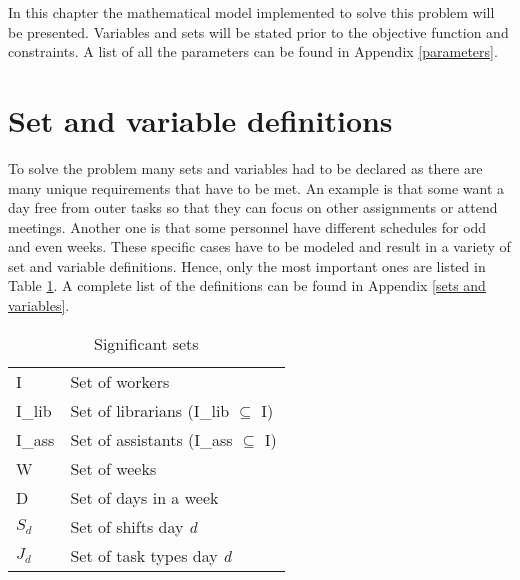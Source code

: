 In this chapter the mathematical model implemented to solve this problem will be presented. Variables and sets will be stated prior to the objective function and constraints. A list of all the parameters can be found in Appendix \ref{parameters}. 
\section{Set and variable definitions} \label{variables}
To solve the problem many sets and variables had to be declared as there are many unique requirements that have to be met. An example is that some want a day free from outer tasks so that they can focus on other assignments or attend meetings. Another one is that some personnel have different schedules for odd and even weeks. These specific cases have to be modeled and result in a variety of set and variable definitions. Hence, only the most important ones are listed in Table \ref{tab:sets}. A complete list of the definitions can be found in Appendix \ref{sets and variables}.
\begin{table}[H]
\centering
\caption{Significant sets}
\label{tab:sets}
\begin{tabular}{ll}
I                & Set of workers                                             \\
I\_lib	& Set of librarians (I\_lib $\subseteq$ I)	\\
I\_ass	& Set of assistants (I\_ass $\subseteq$ I)	\\
W                & Set of weeks                                               \\
D                & Set of days in a week                                      \\
$S_d$           & Set of shifts day \textit{d}                                        \\
$J_d$           & Set of task types day \textit{d}                                    \\          
\end{tabular}
\end{table}

